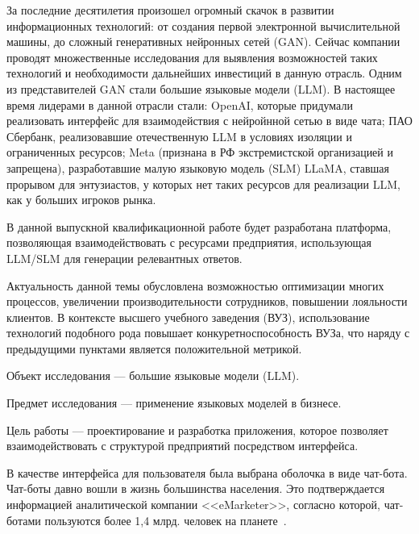 







За последние десятилетия произошел огромный скачок в развитии информационных технологий:
от создания первой электронной вычислительной машины, до сложный генеративных
нейронных сетей (GAN). Сейчас компании проводят множественные исследования
для выявления возможностей таких технологий и необходимости дальнейших
инвестиций в данную отрасль. Одним из представителей GAN стали большие языковые
модели (LLM). В настоящее время лидерами в данной отрасли стали: OpenAI,
которые придумали реализовать интерфейс для взаимодействия с нейройнной сетью 
в виде чата; ПАО Сбербанк, реализовавшие отечественную LLM в условиях изоляции
и ограниченных ресурсов; Meta (признана в РФ экстремистской организацией и 
запрещена), разработавшие малую языковую модель (SLM) LLaMA, ставшая прорывом 
для энтузиастов, у которых нет таких ресурсов для реализации LLM, как у 
больших игроков рынка.

В данной выпускной квалификационной работе 
будет разработана платформа, позволяющая взаимодействовать с ресурсами предприятия,
использующая LLM/SLM для генерации релевантных ответов.

Актуальность данной темы обусловлена возможностью оптимизации многих процессов, 
увеличении производительности сотрудников, повышении лояльности клиентов.
В контексте высшего учебного заведения (ВУЗ), использование технологий подобного рода
повышает конкуретноспособность ВУЗа, что наряду с предыдущими пунктами является
положительной метрикой.

Объект исследования --- большие языковые модели (LLM).

Предмет исследования --- применение языковых моделей в бизнесе.

Цель работы --- проектирование и разработка приложения, которое позволяет
взаимодействовать с структурой предприятий посредством интерфейса.

В качестве интерфейса для пользователя была выбрана оболочка в виде чат-бота.
Чат-боты давно вошли в жизнь большинства населения. Это подтверждается 
информацией аналитической компании <<eMarketer>>, согласно которой, чат-ботами
пользуются более 1,4 млрд. человек на планете~\cite{botucount}.


